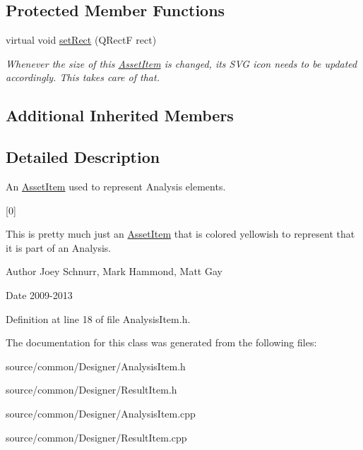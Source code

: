 \subsection*{Protected Member Functions}
\begin{DoxyCompactItemize}
\item 
\hypertarget{class_analysis_item_ad4846bf099fcaec6832913892738887c}{virtual void \hyperlink{class_analysis_item_ad4846bf099fcaec6832913892738887c}{set\-Rect} (Q\-Rect\-F rect)}\label{class_analysis_item_ad4846bf099fcaec6832913892738887c}

\begin{DoxyCompactList}\small\item\em Whenever the size of this \hyperlink{class_asset_item}{Asset\-Item} is changed, its S\-V\-G icon needs to be updated accordingly. This takes care of that. \end{DoxyCompactList}\end{DoxyCompactItemize}
\subsection*{Additional Inherited Members}


\subsection{Detailed Description}
An \hyperlink{class_asset_item}{Asset\-Item} used to represent Analysis elements. 

\mbox{[}0\mbox{]}

This is pretty much just an \hyperlink{class_asset_item}{Asset\-Item} that is colored yellowish to represent that it is part of an Analysis. \begin{DoxyAuthor}{Author}
Joey Schnurr, Mark Hammond, Matt Gay 
\end{DoxyAuthor}
\begin{DoxyDate}{Date}
2009-\/2013 
\end{DoxyDate}


Definition at line 18 of file Analysis\-Item.\-h.



The documentation for this class was generated from the following files\-:\begin{DoxyCompactItemize}
\item 
source/common/\-Designer/Analysis\-Item.\-h\item 
source/common/\-Designer/Result\-Item.\-h\item 
source/common/\-Designer/Analysis\-Item.\-cpp\item 
source/common/\-Designer/Result\-Item.\-cpp\end{DoxyCompactItemize}
